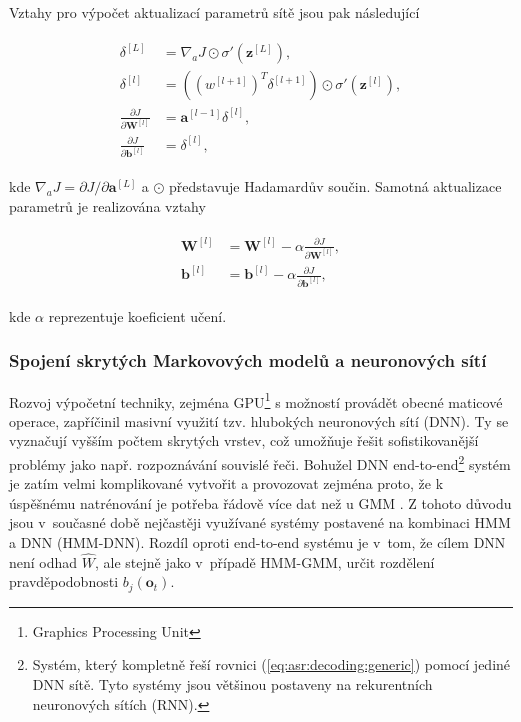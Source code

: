 \noindent Vztahy pro výpočet aktualizací parametrů sítě jsou pak následující

\begin{align}
  \begin{split}
    \delta^{[L]} & = \nabla_{a} J \odot \sigma'\left(\mathbf{z}^{[L]}\right), \\
    \delta^{[l]} & = \left(\left(w^{[l+1]}\right)^T \delta^{[l+1]}\right) \odot \sigma'\left(\mathbf{z}^{[l]}\right), \\
    \frac{\partial J}{\partial \mathbf{W}^{[l]}} & = \mathbf{a}^{[l-1]}\delta^{[l]}, \\
    \frac{\partial J}{\partial \mathbf{b}^{[l]}} & = \delta^{[l]},
  \end{split}
  \label{eq:asr:acoustic:dnn:bp}
\end{align}

\noindent kde $\nabla_a J = \partial J / \partial \mathbf{a}^{[L]}$ a $\odot$ představuje Hadamardův součin. Samotná aktualizace parametrů je realizována vztahy

\begin{align}
  \begin{split}
    \mathbf{W}^{[l]} & = \mathbf{W}^{[l]} - \alpha \frac{\partial J}{\partial \mathbf{W}^{[l]}}, \\
    \mathbf{b}^{[l]} & = \mathbf{b}^{[l]} - \alpha \frac{\partial J}{\partial \mathbf{b}^{[l]}},
  \end{split}
  \label{eq:asr:acoustic:dnn:update}
\end{align}

\noindent kde $\alpha$ reprezentuje koeficient učení.

\subsubsection{Spojení skrytých Markovových modelů a neuronových sítí}

Rozvoj výpočetní techniky, zejména GPU\footnote{Graphics Processing Unit} s možností provádět obecné maticové operace, zapříčinil masivní využití tzv. hlubokých neuronových sítí (DNN). Ty se vyznačují vyšším počtem skrytých vrstev, což umožňuje řešit sofistikovanější problémy jako např. rozpoznávání souvislé řeči. Bohužel DNN end-to-end\footnote{Systém, který kompletně řeší rovnici (\ref{eq:asr:decoding:generic}) pomocí jediné DNN sítě. Tyto systémy jsou většinou postaveny na rekurentních neuronových sítích (RNN).} systém je zatím velmi komplikované vytvořit a provozovat zejména proto, že k úspěšnému natrénování je potřeba řádově více dat než u GMM \cite{Amodei2016}. Z tohoto důvodu jsou v~současné době nejčastěji využívané systémy postavené na kombinaci HMM a DNN (HMM-DNN). Rozdíl oproti end-to-end systému je v~tom, že cílem DNN není odhad $\hat{W}$, ale stejně jako v~případě HMM-GMM, určit rozdělení pravděpodobnosti $b_j\left(\boldsymbol{o}_t\right)$.

